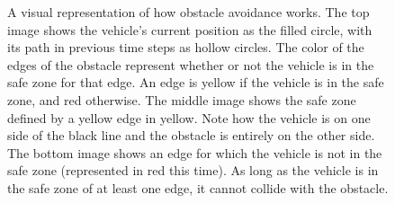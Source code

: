 \begin{figure}[!t]
    \centering
    \hfil
     \hfil
    \caption{A visual representation of how obstacle avoidance works. The top image shows the vehicle's current position as the filled circle, with its path in previous time steps as hollow circles. The color of the edges of the obstacle represent whether or not the vehicle is in the safe zone for that edge. An edge is yellow if the vehicle is in the safe zone, and red otherwise. The middle image shows the safe zone defined by a yellow edge in yellow. Note how the vehicle is on one side of the black line and the obstacle is entirely on the other side. The bottom image shows an edge for which the vehicle is not in the safe zone (represented in red this time). As long as the vehicle is in the safe zone of at least one edge, it cannot collide with the obstacle.}\label{fig:obs}
\end{figure}
